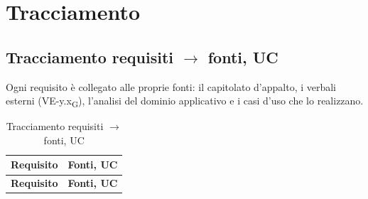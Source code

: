 \section{Tracciamento}

\subsection{Tracciamento requisiti $\rightarrow$ fonti, UC}
Ogni requisito è collegato alle proprie fonti: il capitolato d'appalto, i verbali esterni (VE-y.x\textsubscript{G}), l'analisi del dominio applicativo e i casi d'uso che lo realizzano.
\begin{longtable}{|p{2.8cm}|p{10.2cm}|}
	\caption{Tracciamento requisiti $\rightarrow$ fonti, UC} \\
	\hline
	\rowcolor{primarycolor!10}
	\textbf{Requisito} & \textbf{Fonti, UC} \\
	\hline
	\endfirsthead
	\hline
	\rowcolor{primarycolor!10}
	\textbf{Requisito} & \textbf{Fonti, UC} \\
	\hline
	\endhead


\end{longtable}
